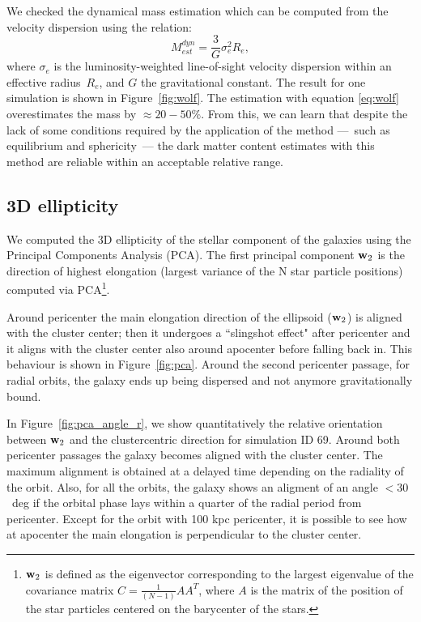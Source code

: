 We checked the dynamical mass estimation which can be computed from the velocity dispersion using the \citet{Wolf2010} relation:
\begin{equation}
\label{eq:wolf}
M^{dyn}_{est} = \dfrac{3}{G} \sigma_e^2 R_e,
\end{equation}
where $\sigma_e$ is the luminosity-weighted line-of-sight velocity dispersion within an effective radius~$R_e$,
and $G$ the gravitational constant.
The result for one simulation is shown in Figure~\ref{fig:wolf}.
The estimation with equation \eqref{eq:wolf} overestimates the mass by $\approx20-50\%$.
From this, we can learn that despite the lack of some conditions required by the application of the method ---~such as equilibrium and sphericity~--- the dark matter content estimates with this method are reliable within an acceptable relative range.



\subsection{3D ellipticity}
We computed the 3D ellipticity of the stellar component of the galaxies using the Principal Components Analysis (PCA).
The first principal component $\boldsymbol{\mathbf{w}}_2$ is the direction of highest elongation (largest variance of the N star particle positions) computed via PCA\footnote{$\boldsymbol{\mathbf{w}}_2$ is defined as the eigenvector corresponding to the largest eigenvalue of the covariance matrix $C = \frac 1 {(N-1)} AA^T$, where $A$ is the matrix of the position of the star particles centered on the barycenter of the stars.}.

Around pericenter the main elongation direction of the ellipsoid ($\boldsymbol{\mathbf{w}}_2$) is aligned with the cluster center; then it undergoes a ``slingshot effect" after pericenter and it aligns with the cluster center also around apocenter before falling back in. This behaviour is shown in Figure~\ref{fig:pca}.
Around the second pericenter passage, for radial orbits, the galaxy ends up being dispersed and not anymore gravitationally bound.

In Figure~\ref{fig:pca_angle_r}, we show quantitatively the relative orientation between $\boldsymbol{\mathbf{w}}_2$ and the clustercentric direction for simulation ID 69.
Around both pericenter passages the galaxy becomes aligned with the cluster center.
The maximum alignment is obtained at a delayed time depending on the radiality of the orbit.
Also, for all the orbits, the galaxy shows an aligment of an angle $<30$~deg if the orbital phase lays within a quarter of the radial period from pericenter. %
Except for the orbit with 100 kpc pericenter, it is possible to see how at apocenter the main elongation is perpendicular to the cluster center. %

